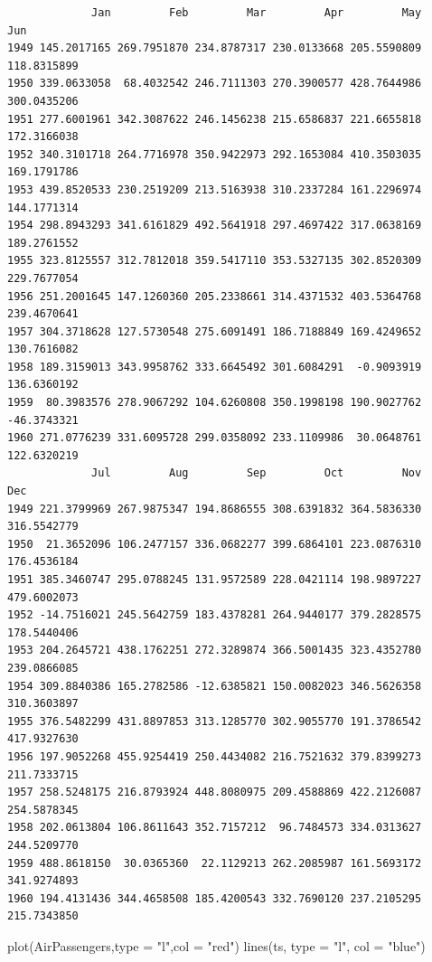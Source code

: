 \documentclass[
  letterpaper,
  DIV=11,
  numbers=noendperiod]{scrreprt}
\newenvironment{Shaded}{\begin{snugshade}}{\end{snugshade}}
\newcommand{\AttributeTok}[1]{\textcolor[rgb]{0.40,0.45,0.13}{#1}}
\newcommand{\FunctionTok}[1]{\textcolor[rgb]{0.28,0.35,0.67}{#1}}
\newcommand{\NormalTok}[1]{\textcolor[rgb]{0.00,0.23,0.31}{#1}}
\newcommand{\StringTok}[1]{\textcolor[rgb]{0.13,0.47,0.30}{#1}}
\begin{document}
\begin{verbatim}
             Jan         Feb         Mar         Apr         May         Jun
1949 145.2017165 269.7951870 234.8787317 230.0133668 205.5590809 118.8315899
1950 339.0633058  68.4032542 246.7111303 270.3900577 428.7644986 300.0435206
1951 277.6001961 342.3087622 246.1456238 215.6586837 221.6655818 172.3166038
1952 340.3101718 264.7716978 350.9422973 292.1653084 410.3503035 169.1791786
1953 439.8520533 230.2519209 213.5163938 310.2337284 161.2296974 144.1771314
1954 298.8943293 341.6161829 492.5641918 297.4697422 317.0638169 189.2761552
1955 323.8125557 312.7812018 359.5417110 353.5327135 302.8520309 229.7677054
1956 251.2001645 147.1260360 205.2338661 314.4371532 403.5364768 239.4670641
1957 304.3718628 127.5730548 275.6091491 186.7188849 169.4249652 130.7616082
1958 189.3159013 343.9958762 333.6645492 301.6084291  -0.9093919 136.6360192
1959  80.3983576 278.9067292 104.6260808 350.1998198 190.9027762 -46.3743321
1960 271.0776239 331.6095728 299.0358092 233.1109986  30.0648761 122.6320219
             Jul         Aug         Sep         Oct         Nov         Dec
1949 221.3799969 267.9875347 194.8686555 308.6391832 364.5836330 316.5542779
1950  21.3652096 106.2477157 336.0682277 399.6864101 223.0876310 176.4536184
1951 385.3460747 295.0788245 131.9572589 228.0421114 198.9897227 479.6002073
1952 -14.7516021 245.5642759 183.4378281 264.9440177 379.2828575 178.5440406
1953 204.2645721 438.1762251 272.3289874 366.5001435 323.4352780 239.0866085
1954 309.8840386 165.2782586 -12.6385821 150.0082023 346.5626358 310.3603897
1955 376.5482299 431.8897853 313.1285770 302.9055770 191.3786542 417.9327630
1956 197.9052268 455.9254419 250.4434082 216.7521632 379.8399273 211.7333715
1957 258.5248175 216.8793924 448.8080975 209.4588869 422.2126087 254.5878345
1958 202.0613804 106.8611643 352.7157212  96.7484573 334.0313627 244.5209770
1959 488.8618150  30.0365360  22.1129213 262.2085987 161.5693172 341.9274893
1960 194.4131436 344.4658508 185.4200543 332.7690120 237.2105295 215.7343850
\end{verbatim}

\begin{Shaded}
\begin{Highlighting}[]
\FunctionTok{plot}\NormalTok{(AirPassengers,}\AttributeTok{type =} \StringTok{"l"}\NormalTok{,}\AttributeTok{col =} \StringTok{"red"}\NormalTok{)}
\FunctionTok{lines}\NormalTok{(ts, }\AttributeTok{type =} \StringTok{"l"}\NormalTok{, }\AttributeTok{col =} \StringTok{"blue"}\NormalTok{)}
\end{Highlighting}
\end{Shaded}
\end{document}
